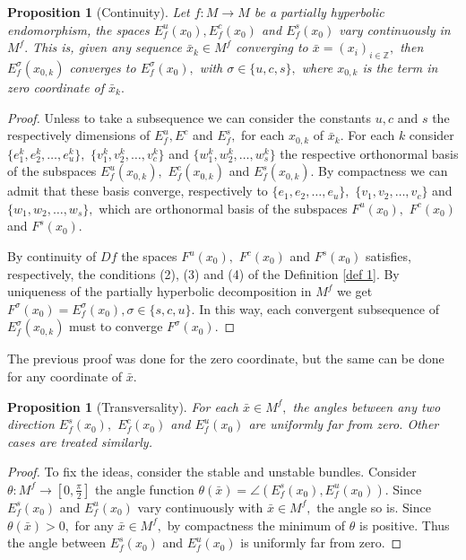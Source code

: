 \documentclass[12pt,reqno]{amsart}
\numberwithin{equation}{section}
\theoremstyle{plain}
\newtheorem{proposition}[theorem]{Proposition}
\theoremstyle{remark}
\begin{document}
\begin{proposition}[Continuity]\label{prop 07}
Let $f:M \rightarrow M$ be a partially hyperbolic endomorphism, the spaces $E^u_f(x_0),E^c_f(x_0)$ and $E^s_f(x_0)$ vary continuously in $M^f.$ This is, given any sequence $\bar{x}_k\in M^f$ converging to $\bar{x} = (x_i)_{i \in \mathbb{Z}},$ then $E^{\sigma}_f(x_{0,k})$ converges to $E^{\sigma}_f(x_0),$ with $\sigma\in \{u,c,s\},$ where $x_{0,k}$ is the term in zero coordinate of $\bar{x}_k.$
\end{proposition}

\begin{proof} Unless to take a subsequence we can consider the constants $u,c$ and $s$ the respectively dimensions of $E^u_f,E^c$ and $E^s_f,$ for each $x_{0,k}$ of $\bar{x}_k.$ For each $k$ consider $\{e^k_1,e^k_2,\ldots,e^k_u\},$
$\{v^k_1,v^k_2,\ldots,v^k_c\}$ and $\{w^k_1,w^k_2,\ldots,w^k_s\}$ the respective orthonormal basis of the subspaces $E^u_f(x_{0,k}),$
$E^c_f(x_{0,k})$ and $E^s_f(x_{0,k}).$ By compactness we can admit that these basis converge, respectively to $\{e_1,e_2,\ldots,e_u\},$
$\{v_1,v_2,\ldots,v_c\}$ and $\{w_1,w_2,\ldots,w_s\},$  which are orthonormal basis of the subspaces $F^u(x_0),$
$F^c(x_0)$ and $F^s(x_0).$

By continuity of $Df$ the spaces $F^u(x_0),$
$F^c(x_0)$ and $F^s(x_0)$ satisfies, respectively, the conditions (2), (3) and (4)
of the Definition \ref{def 1}. By uniqueness of the partially hyperbolic decomposition in $M^f$ we get $F^{\sigma}(x_0)=E^{\sigma}_f(x_0),\sigma \in \{s,c,u\}.$ In this way, each  convergent subsequence  of $E^{\sigma}_f(x_{0,k})$ must to converge $F^{\sigma}(x_0).$



\end{proof}


The previous proof was done for the zero coordinate, but the same can be done for any coordinate of $\bar{x}.$



\begin{proposition}[Transversality]
For each $\bar{x} \in M^f,$ the angles between any two direction $E^s_f(x_0),$ $E^c_f(x_0)$ and $E^u_f(x_0)$ are uniformly far from zero. Other cases are treated similarly.
\end{proposition}

\begin{proof} To fix the ideas, consider the stable and unstable bundles. Consider $\theta: M^f \rightarrow [0, \frac{\pi}{2}]$ the angle function $\theta(\bar{x}) = \angle ( E^s_f(x_0), E^u_f(x_0) ).$ Since $E^s_f(x_0)$ and $E^u_f(x_0)$ vary continuously with $\bar{x} \in M^f,$ the angle so is. Since $\theta(\bar{x}) > 0,$ for any $\bar{x} \in M^f,$ by compactness the minimum of $\theta$ is positive. Thus the angle between $E^s_f(x_0)$ and $E^u_f(x_0)$ is uniformly far from zero.


\end{proof}
\end{document}

